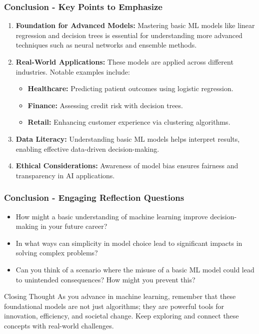 \documentclass[aspectratio=169]{beamer}
\begin{document}
\begin{frame}[fragile]
    \frametitle{Conclusion - Key Points to Emphasize}
    \begin{enumerate}
        \item \textbf{Foundation for Advanced Models:}  
        Mastering basic ML models like linear regression and decision trees is essential for understanding more advanced techniques such as neural networks and ensemble methods.
        
        \item \textbf{Real-World Applications:}  
        These models are applied across different industries. Notable examples include:
        \begin{itemize}
            \item \textbf{Healthcare:} Predicting patient outcomes using logistic regression.
            \item \textbf{Finance:} Assessing credit risk with decision trees.
            \item \textbf{Retail:} Enhancing customer experience via clustering algorithms.
        \end{itemize}
        
        \item \textbf{Data Literacy:}  
        Understanding basic ML models helps interpret results, enabling effective data-driven decision-making.
        
        \item \textbf{Ethical Considerations:}  
        Awareness of model bias ensures fairness and transparency in AI applications.
    \end{enumerate}
\end{frame}

\begin{frame}[fragile]
    \frametitle{Conclusion - Engaging Reflection Questions}
    \begin{itemize}
        \item How might a basic understanding of machine learning improve decision-making in your future career?
        \item In what ways can simplicity in model choice lead to significant impacts in solving complex problems?
        \item Can you think of a scenario where the misuse of a basic ML model could lead to unintended consequences? How might you prevent this?
    \end{itemize}

    \begin{block}{Closing Thought}
        As you advance in machine learning, remember that these foundational models are not just algorithms; they are powerful tools for innovation, efficiency, and societal change. Keep exploring and connect these concepts with real-world challenges.
    \end{block}
\end{frame}
\end{document}
